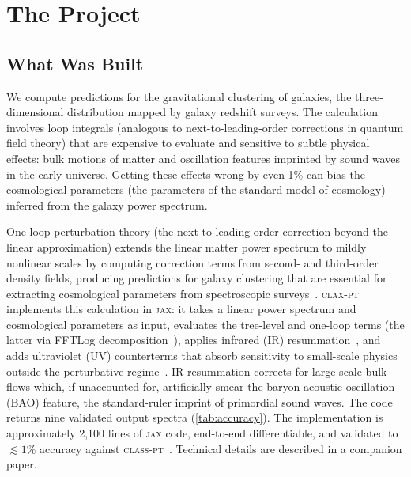 \documentclass{article}
\newcommand{\claxpt}{\textsc{clax-pt}\xspace}
\newcommand{\classpt}{\textsc{class-pt}\xspace}
\newcommand{\jax}{\textsc{jax}\xspace}
\begin{document}
\section{The Project}
\label{sec:project}

\subsection{What Was Built}
\label{sec:what}

We compute predictions for the gravitational clustering of galaxies, the three-dimensional distribution mapped by galaxy redshift surveys. The calculation involves loop integrals (analogous to next-to-leading-order corrections in quantum field theory) that are expensive to evaluate and sensitive to subtle physical effects: bulk motions of matter and oscillation features imprinted by sound waves in the early universe. Getting these effects wrong by even 1\% can bias the cosmological parameters (the parameters of the standard model of cosmology) inferred from the galaxy power spectrum.

One-loop perturbation theory (the next-to-leading-order correction beyond the linear approximation) extends the linear matter power spectrum to mildly nonlinear scales by computing correction terms from second- and third-order density fields, producing predictions for galaxy clustering that are essential for extracting cosmological parameters from spectroscopic surveys~\citep{damico2020, perko2016}. \claxpt implements this calculation in \jax: it takes a linear power spectrum and cosmological parameters as input, evaluates the tree-level and one-loop terms (the latter via FFTLog decomposition~\citep{simonovic2018, fang2017}), applies infrared (IR) resummation~\citep{senatore2015, vlah2015}, and adds ultraviolet (UV) counterterms that absorb sensitivity to small-scale physics outside the perturbative regime~\citep{Baumann:2010tm, Carroll:2013oxa}. IR resummation corrects for large-scale bulk flows which, if unaccounted for, artificially smear the baryon acoustic oscillation (BAO) feature, the standard-ruler imprint of primordial sound waves. The code returns nine validated output spectra (\cref{tab:accuracy}). The implementation is approximately 2,100 lines of \jax code, end-to-end differentiable, and validated to ${\lesssim}1\%$ accuracy against \classpt~\citep{chudaykin2021}. Technical details are described in a companion paper.
\end{document}

